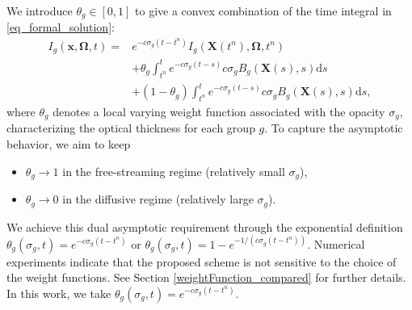 \documentclass[preprint,12pt]{elsarticle}
\theoremstyle{definition}
\theoremstyle{plain}
\numberwithin{equation}{section}
\numberwithin{algorithm}{section}
\newcounter{eq_count}
\newcommand{\vOmega}{\mathbf{\Omega}}
\newcommand{\vx}{\mathbf{x}}
\newcommand{\mfx}{{\mathbf{X}}}
\newcommand{\dd}{{\text{d}}}
\begin{document}
 We introduce $\theta_g \in [0,1]$ to give a convex combination of the time integral in \eqref{eq_formal_solution}:
    \begin{equation}\label{eq_formal_solution2}
		\begin{aligned}
			I_g( \vx, \vOmega,t)= & e^{- c  \sigma_g (t - t^n )} I_{g}( \mfx(t^n), \vOmega, t^n ) 
            \\ 
			& +\theta_g \int_{t^n}^{t} e^{- c  \sigma_g (t - s )} c\sigma_{g} B_g ( \mfx(s),  s )\dd{s}
            \\
            & +(1-\theta_g)\int_{t^n}^{t} e^{- c  \sigma_g (t - s )} c\sigma_{g} B_g ( \mfx(s),  s )\dd{s},
		\end{aligned}
    \end{equation}
     where $\theta_g$ denotes a local varying weight function associated with the opacity $\sigma_g$, characterizing the optical thickness for each group $g$. %
To capture the asymptotic behavior, we aim to keep
\begin{itemize}
    \item $\theta_g \to 1$ in the free-streaming regime (relatively small $\sigma_g$),
    \item $\theta_g \to 0$ in the diffusive regime (relatively large $\sigma_g$).
\end{itemize}
We achieve this dual asymptotic requirement through the exponential definition $\theta_g(\sigma_g,t) = e^{-c \sigma_{g} (t-t^n)}$ or $\theta_g(\sigma_g,t)= 1 - e^{-1 / (c \sigma_{g} (t-t^n))}$. Numerical experiments indicate that the proposed scheme is not sensitive to the choice of the weight functions. See Section \ref{weightFunction_compared} for further details. In this work, we take $\theta_g(\sigma_g,t) = e^{-c \sigma_{g} (t-t^n)}$.
\end{document}
